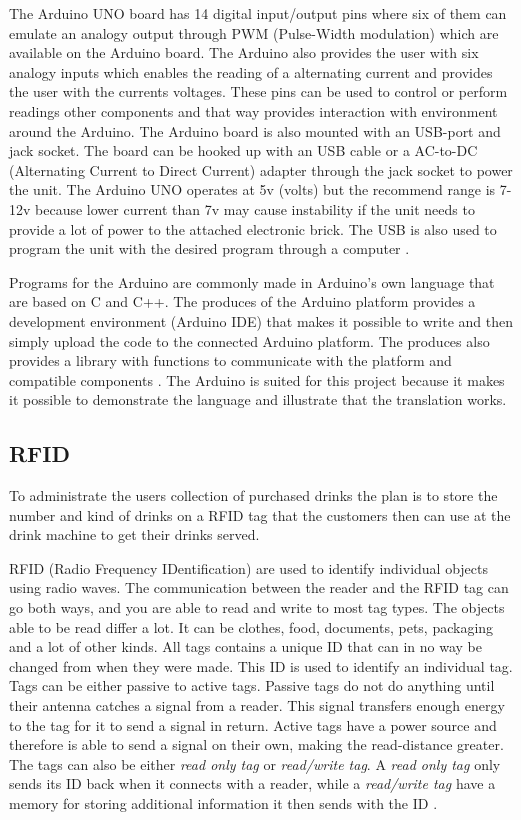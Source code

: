 The Arduino UNO board has 14 digital input/output pins where six of them can emulate an analogy output through PWM (Pulse-Width modulation) which are available on the Arduino board. The Arduino also provides the user with six analogy inputs which enables the reading of a alternating current and provides the user with the currents voltages. These pins can be used to control or perform readings other components and that way provides interaction with environment around the Arduino.
The Arduino board is also mounted with an USB-port and jack socket. The board can be hooked up with an USB cable or a AC-to-DC (Alternating Current to Direct Current) adapter through the jack socket to power the unit. The Arduino UNO operates at 5v (volts) but the recommend range is 7-12v because lower current than 7v may cause instability if the unit needs to provide a lot of power to the attached electronic brick. The USB is also used to program the unit with the desired program through a computer \citep{ArduinoUno}.

Programs for the Arduino are commonly made in Arduino's own language that are based on C and C++. The produces of the Arduino platform provides a development environment (Arduino IDE) that makes it possible to write and then simply upload the code to the connected Arduino platform. The produces also provides a library with functions to communicate with the platform and compatible components \citep{ArduinoLanguage}.
The Arduino is suited for this project because it makes it possible to demonstrate the language and illustrate that the translation works.
\label{sec:hardwarearduino}

\subsection{RFID}
To administrate the users collection of purchased drinks the plan is to store the number and kind of drinks on a RFID tag that the customers then can use at the drink machine to get their drinks served.

RFID (Radio Frequency IDentification) are used to identify individual objects using radio waves.
The communication between the reader and the RFID tag can go both ways, and you are able to read and write to most tag types. 
The objects able to be read differ a lot. It can be clothes, food, documents, pets, packaging and a lot of other kinds. 
All tags contains a unique ID that can in no way be changed from when they were made. This ID is used to identify an individual tag.
Tags can be either passive to active tags. Passive tags do not do anything until their antenna catches a signal from a reader. This signal transfers enough energy to the tag for it to send a signal in return. Active tags have a power source and therefore is able to send a signal on their own, making the read-distance greater.
The tags can also be either \textit{read only tag} or \textit{read/write tag}. A \textit{read only tag} only sends its ID back when it connects with a reader, while a \textit{read/write tag} have a memory for storing additional information it then sends with the ID \citep{RFID}.


